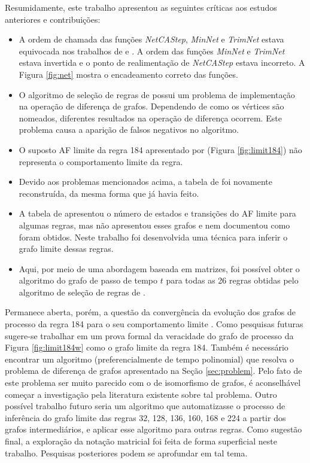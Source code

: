 \documentclass[12pt,a4paper]{article}
\begin{document}
Resumidamente, este trabalho apresentou as seguintes críticas aos estudos
anteriores e contribuições:

\begin{itemize}
\item A ordem de chamada das funções \emph{NetCAStep}, \emph{MinNet} e \emph{TrimNet} estava
equivocada nos trabalhos de  e .
A ordem das funções \emph{MinNet} e \emph{TrimNet} estava invertida e o ponto de
realimentação de \emph{NetCAStep} estava incorreto. A Figura \ref{fig:net} mostra o
encadeamento correto das funções.

\item O algoritmo de seleção de regras de  possui
um problema de implementação na operação de diferença de grafos. Dependendo
de como os vértices são nomeados, diferentes resultados na operação de
diferença ocorrem. Este problema causa a aparição de falsos negativos no
algoritmo.

\item O suposto AF limite da regra 184 apresentado por 
(Figura \ref{fig:limit184}) não representa o comportamento limite da regra.

\item Devido aos problemas mencionados acima, a tabela de
 foi novamente reconstruída, da mesma forma que
 já havia feito.

\item A tabela de  apresentou o número de estados
e transições do AF limite para algumas regras, mas não
apresentou esses grafos e nem documentou como foram obtidos. Neste trabalho
foi desenvolvida uma técnica para inferir o grafo limite dessas regras.

\item Aqui, por meio de uma abordagem baseada em matrizes, foi possível
obter o algoritmo do grafo de passo de tempo $t$ para todas as 26 regras
obtidas pelo algoritmo de seleção de regras de .
\end{itemize}

Permanece aberta, porém, a questão da convergência da evolução dos grafos
de processo da regra 184 para o seu comportamento limite .
Como pesquisas futuras sugere-se trabalhar em um prova formal da veracidade
do grafo de processo da Figura \ref{fig:limit184w} como o grafo limite da regra
184. Também é necessário encontrar um algoritmo (preferencialmente de tempo
polinomial) que resolva
o problema de diferença de grafos apresentado na Seção \ref{sec:problem}.
Pelo fato de este problema ser muito parecido com o de isomorfismo de grafos,
é aconselhável começar a investigação pela literatura existente sobre tal
problema. Outro possível trabalho futuro seria um algoritmo que automatizasse
o processo de inferência do grafo limite das regras 32, 128, 136, 160, 168
e 224 a partir dos grafos intermediários, e aplicar esse algoritmo para outras regras.
Como sugestão final, a exploração da notação matricial foi feita de forma
superficial neste trabalho.  Pesquisas posteriores podem se aprofundar em
tal tema.
\end{document}
